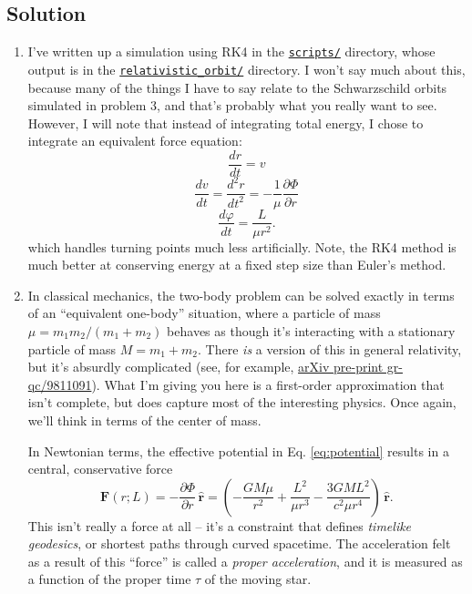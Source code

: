 \documentclass[11pt]{article}
\begin{document}

\vspace{1000pt}


\subsection*{Solution}

\begin{enumerate}

\item I've written up a simulation using RK4 in the \href{https://github.com/alurban/mentoring/blob/master/tidal_distortion/scripts/kepler_orbits_rk4.py}{\texttt{scripts/}} directory, whose output is in the \href{https://github.com/alurban/mentoring/blob/master/tidal_distortion/relativistic_orbit/}{\texttt{relativistic\_orbit/}} directory. I won't say much about this, because many of the things I have to say relate to the Schwarzschild orbits simulated in problem 3, and that's probably what you really want to see. However, I will note that instead of integrating total energy, I chose to integrate an equivalent force equation:
\[ \frac{dr}{dt} = v \]
\[ \frac{dv}{dt} = \frac{d^2 r}{dt^2} = -\frac{1}{\mu}\frac{\partial\Phi}{\partial r} \]
\[ \frac{d\varphi}{dt} = \frac{L}{\mu r^2}. \]
which handles turning points much less artificially. Note, the RK4 method is much better at conserving energy at a fixed step size than Euler's method.

\item In classical mechanics, the two-body problem can be solved exactly in terms of an ``equivalent one-body'' situation, where a particle of mass $\mu = m_1 m_2/(m_1 + m_2)$ behaves as though it's interacting with a stationary particle of mass $M = m_1 + m_2$. There \emph{is} a version of this in general relativity, but it's absurdly complicated (see, for example, \href{https://arxiv.org/pdf/gr-qc/9811091.pdf}{arXiv pre-print gr-qc/9811091}). What I'm giving you here is a first-order approximation that isn't complete, but does capture most of the interesting physics. Once again, we'll think in terms of the center of mass.

\hspace{15pt} In Newtonian terms, the effective potential in Eq. \ref{eq:potential} results in a central, conservative force
\begin{equation}\label{eq:schswarzschild_force}
\mathbf{F}(r; L) = -\frac{\partial\Phi}{\partial r}\,\hat{\mathbf{r}} = \left( -\frac{GM\mu}{r^2} + \frac{L^2}{\mu r^3} - \frac{3GML^2}{c^2\mu r^4} \right) \, \hat{\mathbf{r}}.
\end{equation}
This isn't really a force at all -- it's a constraint that defines \textit{timelike geodesics}, or shortest paths through curved spacetime. The acceleration felt as a result of this ``force'' is called a \textit{proper acceleration}, and it is measured as a function of the proper time $\tau$ of the moving star.


\end{enumerate}
\end{document}
